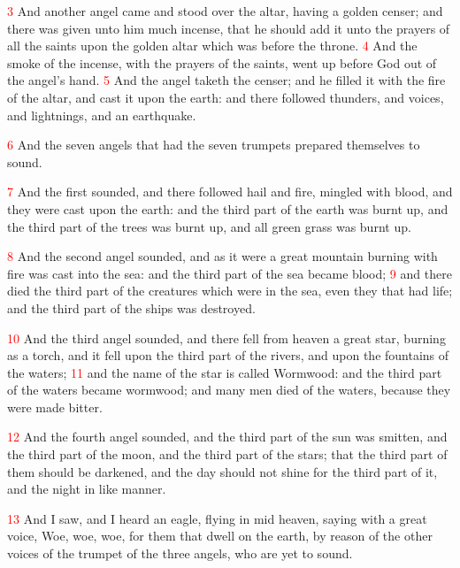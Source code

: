 \documentclass[12pt,twoside]{memoir}
\newcommand{\vnum}[1]{\textcolor{red}{\normalsize{#1}}}
\begin{document}
\vnum{3} And another angel came and stood over the altar, having a golden censer; and there was given unto him much incense, that he should add it unto the prayers of all the saints upon the golden altar which was before the throne. %
\vnum{4} And the smoke of the incense, with the prayers of the saints, went up before God out of the angel’s hand. %
\vnum{5} And the angel taketh the censer; and he filled it with the fire of the altar, and cast it upon the earth: and there followed thunders, and voices, and lightnings, and an earthquake.

\vnum{6} And the seven angels that had the seven trumpets prepared themselves to sound.

\vnum{7} And the first sounded, and there followed hail and fire, mingled with blood, and they were cast upon the earth: and the third part of the earth was burnt up, and the third part of the trees was burnt up, and all green grass was burnt up.

\vnum{8} And the second angel sounded, and as it were a great mountain burning with fire was cast into the sea: and the third part of the sea became blood; %
\vnum{9} and there died the third part of the creatures which were in the sea, even they that had life; and the third part of the ships was destroyed.

\vnum{10} And the third angel sounded, and there fell from heaven a great star, burning as a torch, and it fell upon the third part of the rivers, and upon the fountains of the waters; %
\vnum{11} and the name of the star is called Wormwood: and the third part of the waters became wormwood; and many men died of the waters, because they were made bitter.

\vnum{12} And the fourth angel sounded, and the third part of the sun was smitten, and the third part of the moon, and the third part of the stars; that the third part of them should be darkened, and the day should not shine for the third part of it, and the night in like manner.

\vnum{13} And I saw, and I heard an eagle, flying in mid heaven, saying with a great voice, Woe, woe, woe, for them that dwell on the earth, by reason of the other voices of the trumpet of the three angels, who are yet to sound.

\end{document}
